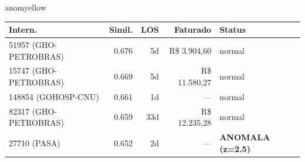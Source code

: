 \documentclass[a4paper,10pt]{article}
\begin{document}
\begin{anomalycard}[Internacao 116007 | GHO-BRADESCO | MODERADO (z=2.94)]{anomyellow}
\begin{tabular}{l r r r l}\toprule\textbf{Intern.} & \textbf{Simil.} & \textbf{LOS} & \textbf{Faturado} & \textbf{Status} \\\midrule
51957 (GHO-PETROBRAS) & 0.676 & 5d & R\$ 3.904,60 & \textcolor{jcubeblue}{normal} \\
15747 (GHO-PETROBRAS) & 0.669 & 5d & R\$ 11.580,27 & \textcolor{jcubeblue}{normal} \\
148854 (GOHOSP-CNU) & 0.661 & 1d & --- & \textcolor{jcubeblue}{normal} \\
82317 (GHO-PETROBRAS) & 0.659 & 33d & R\$ 12.235,28 & \textcolor{jcubeblue}{normal} \\
27710 (PASA) & 0.652 & 2d & --- & \textcolor{anomred}{\textbf{ANOMALA (z=2.5)}} \\
\bottomrule\end{tabular}


\end{anomalycard}

\newpage
\end{document}
